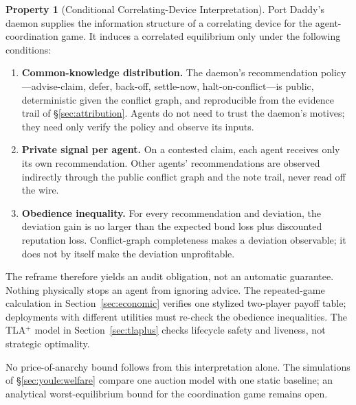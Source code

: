 \documentclass[11pt,a4paper]{article}
\theoremstyle{definition}
\newtheorem{property}{Property}[section]
\theoremstyle{remark}
\begin{document}
\begin{property}[Conditional Correlating-Device Interpretation]\label{prop:correlating-device}
Port Daddy's daemon supplies the information structure of a correlating device for the agent-coordination game. It induces a correlated equilibrium only under the following conditions:
\begin{enumerate}[nosep]
  \item \textbf{Common-knowledge distribution.} The daemon's recommendation policy---advise-claim, defer, back-off, settle-now, halt-on-conflict---is public, deterministic given the conflict graph, and reproducible from the evidence trail of \S\ref{sec:attribution}. Agents do not need to trust the daemon's motives; they need only verify the policy and observe its inputs.
  \item \textbf{Private signal per agent.} On a contested claim, each agent receives only its own recommendation. Other agents' recommendations are observed indirectly through the public conflict graph and the note trail, never read off the wire.
  \item \textbf{Obedience inequality.} For every recommendation and deviation, the deviation gain is no larger than the expected bond loss plus discounted reputation loss. Conflict-graph completeness makes a deviation observable; it does not by itself make the deviation unprofitable.
\end{enumerate}
\end{property}

The reframe therefore yields an audit obligation, not an automatic guarantee. Nothing physically stops an agent from ignoring advice. The repeated-game calculation in Section~\ref{sec:economic} verifies one stylized two-player payoff table; deployments with different utilities must re-check the obedience inequalities. The TLA$^{+}$ model in Section~\ref{sec:tlaplus} checks lifecycle safety and liveness, not strategic optimality.

No price-of-anarchy bound follows from this interpretation alone. The simulations of \S\ref{sec:youle:welfare} compare one auction model with one static baseline; an analytical worst-equilibrium bound for the coordination game remains open.
\end{document}
